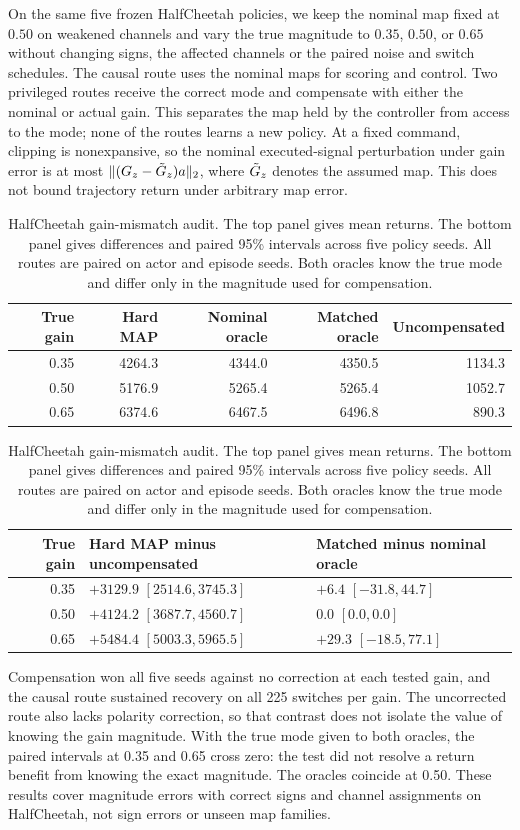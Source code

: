 On the same five frozen HalfCheetah policies, we keep the nominal map fixed at \(0.50\) on weakened channels and vary the true magnitude to \(0.35\), \(0.50\), or \(0.65\) without changing signs, the affected channels or the paired noise and switch schedules. The causal route uses the nominal maps for scoring and control. Two privileged routes receive the correct mode and compensate with either the nominal or actual gain. This separates the map held by the controller from access to the mode; none of the routes learns a new policy. At a fixed command, clipping is nonexpansive, so the nominal executed-signal perturbation under gain error is at most \(\|(G_z-\tilde{G}_z)a\|_2\), where \(\tilde{G}_z\) denotes the assumed map. This does not bound trajectory return under arbitrary map error.

\begin{table}[t]
\centering
\small
\setlength{\tabcolsep}{4pt}
\caption{HalfCheetah gain-mismatch audit. The top panel gives mean returns. The bottom panel gives differences and paired 95\% intervals across five policy seeds. All routes are paired on actor and episode seeds. Both oracles know the true mode and differ only in the magnitude used for compensation.}
\label{tab:gain_mismatch}
\begin{tabular}{rrrrr}
\toprule
True gain & Hard MAP & Nominal oracle & Matched oracle & Uncompensated \\
\midrule
0.35 & 4264.3 & 4344.0 & 4350.5 & 1134.3 \\
0.50 & 5176.9 & 5265.4 & 5265.4 & 1052.7 \\
0.65 & 6374.6 & 6467.5 & 6496.8 & 890.3 \\
\bottomrule
\end{tabular}
\par\smallskip
\begin{tabular}{rll}
\toprule
True gain & Hard MAP minus uncompensated & Matched minus nominal oracle \\
\midrule
0.35 & \(+3129.9\) \([2514.6,3745.3]\) & \(+6.4\) \([-31.8,44.7]\) \\
0.50 & \(+4124.2\) \([3687.7,4560.7]\) & \(0.0\) \([0.0,0.0]\) \\
0.65 & \(+5484.4\) \([5003.3,5965.5]\) & \(+29.3\) \([-18.5,77.1]\) \\
\bottomrule
\end{tabular}
\end{table}

Compensation won all five seeds against no correction at each tested gain, and the causal route sustained recovery on all 225 switches per gain. The uncorrected route also lacks polarity correction, so that contrast does not isolate the value of knowing the gain magnitude. With the true mode given to both oracles, the paired intervals at 0.35 and 0.65 cross zero: the test did not resolve a return benefit from knowing the exact magnitude. The oracles coincide at 0.50. These results cover magnitude errors with correct signs and channel assignments on HalfCheetah, not sign errors or unseen map families.
